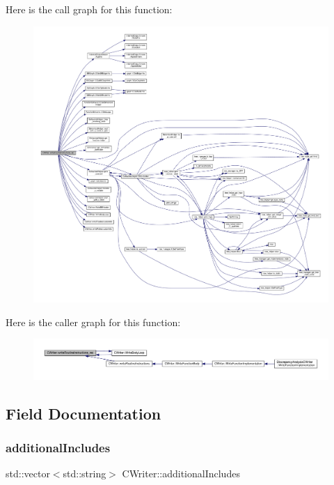 Here is the call graph for this function\+:
\nopagebreak
\begin{figure}[H]
\begin{center}
\leavevmode
\includegraphics[width=350pt]{d3/d59/classCWriter_a10d0233fea0a92085a3aa160b9e39845_cgraph}
\end{center}
\end{figure}
Here is the caller graph for this function\+:
\nopagebreak
\begin{figure}[H]
\begin{center}
\leavevmode
\includegraphics[width=350pt]{d3/d59/classCWriter_a10d0233fea0a92085a3aa160b9e39845_icgraph}
\end{center}
\end{figure}


\subsection{Field Documentation}
\mbox{\label{classCWriter_a13c76532724ccd44bc1c86fb9de7317f}} 
\subsubsection{\texorpdfstring{additional\+Includes}{additionalIncludes}}
{\footnotesize\ttfamily std\+::vector$<$std\+::string$>$ C\+Writer\+::additional\+Includes\hspace{0.3cm}{\ttfamily [protected]}}



